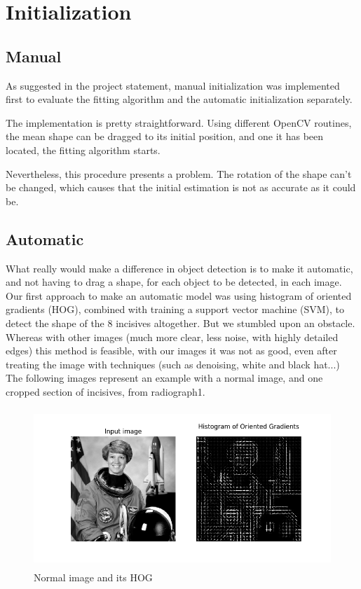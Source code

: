 \section{Initialization}

\subsection{Manual}
As suggested in the project statement, manual initialization
was implemented first to evaluate the fitting algorithm and
the automatic initialization separately.

The implementation is pretty straightforward. Using different
OpenCV routines, the mean shape can be dragged to its initial
position, and one it has been located, the fitting algorithm starts.

Nevertheless, this procedure presents a problem. The rotation of the
shape can't be changed, which causes that the initial estimation is not
as accurate as it could be.

\subsection{Automatic}

What really would make a difference in object detection is to make it automatic,
and not having to drag a shape, for each object to be detected, in each image.
Our first approach to make an automatic model was using histogram of oriented
gradients (HOG), combined with training a support vector machine (SVM), to
detect the shape of the 8 incisives altogether. But we stumbled upon an
obstacle. Whereas with other images (much more clear, less noise, with highly
detailed edges) this method is feasible, with our images it was not as good,
even after treating the image with techniques (such as denoising, white and
black hat...) The following images represent an example with a normal image, 
and one cropped section of incisives, from radiograph1.

\begin{figure}[h]
  \centering
  \includegraphics[height=6cm]{img/astro_hog}
  \caption{Normal image and its HOG}
\end{figure}

